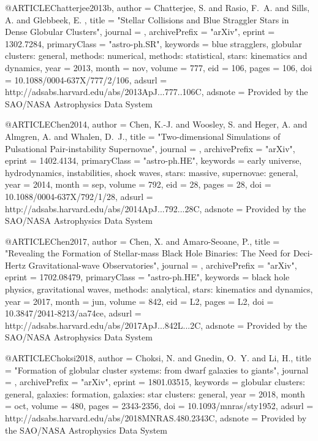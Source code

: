 \documentclass[twocolumn,tighten]{aastex63}
\begin{document}
{{{{{@ARTICLE{Chatterjee2013b,
   author = {{Chatterjee}, S. and {Rasio}, F.~A. and {Sills}, A. and {Glebbeek}, E.
	},
    title = "{Stellar Collisions and Blue Straggler Stars in Dense Globular Clusters}",
  journal = {\apj},
archivePrefix = "arXiv",
   eprint = {1302.7284},
 primaryClass = "astro-ph.SR",
 keywords = {blue stragglers, globular clusters: general, methods: numerical, methods: statistical, stars: kinematics and dynamics},
     year = 2013,
    month = nov,
   volume = 777,
      eid = {106},
    pages = {106},
      doi = {10.1088/0004-637X/777/2/106},
   adsurl = {http://adsabs.harvard.edu/abs/2013ApJ...777..106C},
  adsnote = {Provided by the SAO/NASA Astrophysics Data System}
}

@ARTICLE{Chen2014,
   author = {{Chen}, K.-J. and {Woosley}, S. and {Heger}, A. and {Almgren}, A. and 
	{Whalen}, D.~J.},
    title = "{Two-dimensional Simulations of Pulsational Pair-instability Supernovae}",
  journal = {\apj},
archivePrefix = "arXiv",
   eprint = {1402.4134},
 primaryClass = "astro-ph.HE",
 keywords = {early universe, hydrodynamics, instabilities, shock waves, stars: massive, supernovae: general},
     year = 2014,
    month = sep,
   volume = 792,
      eid = {28},
    pages = {28},
      doi = {10.1088/0004-637X/792/1/28},
   adsurl = {http://adsabs.harvard.edu/abs/2014ApJ...792...28C},
  adsnote = {Provided by the SAO/NASA Astrophysics Data System}
}

@ARTICLE{Chen2017,
   author = {{Chen}, X. and {Amaro-Seoane}, P.},
    title = "{Revealing the Formation of Stellar-mass Black Hole Binaries: The Need for Deci-Hertz Gravitational-wave Observatories}",
  journal = {\apjl},
archivePrefix = "arXiv",
   eprint = {1702.08479},
 primaryClass = "astro-ph.HE",
 keywords = {black hole physics, gravitational waves, methods: analytical, stars: kinematics and dynamics},
     year = 2017,
    month = jun,
   volume = 842,
      eid = {L2},
    pages = {L2},
      doi = {10.3847/2041-8213/aa74ce},
   adsurl = {http://adsabs.harvard.edu/abs/2017ApJ...842L...2C},
  adsnote = {Provided by the SAO/NASA Astrophysics Data System}
}

@ARTICLE{Choksi2018,
   author = {{Choksi}, N. and {Gnedin}, O.~Y. and {Li}, H.},
    title = "{Formation of globular cluster systems: from dwarf galaxies to giants}",
  journal = {\mnras},
archivePrefix = "arXiv",
   eprint = {1801.03515},
 keywords = {globular clusters: general, galaxies: formation, galaxies: star clusters: general},
     year = 2018,
    month = oct,
   volume = 480,
    pages = {2343-2356},
      doi = {10.1093/mnras/sty1952},
   adsurl = {http://adsabs.harvard.edu/abs/2018MNRAS.480.2343C},
  adsnote = {Provided by the SAO/NASA Astrophysics Data System}
}

}}}}}
\end{document}
